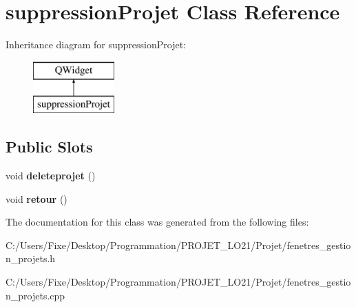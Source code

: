 \hypertarget{classsuppression_projet}{}\section{suppression\+Projet Class Reference}
\label{classsuppression_projet}
Inheritance diagram for suppression\+Projet\+:\begin{figure}[H]
\begin{center}
\leavevmode
\includegraphics[height=2.000000cm]{classsuppression_projet}
\end{center}
\end{figure}
\subsection*{Public Slots}
\begin{DoxyCompactItemize}
\item 
\hypertarget{classsuppression_projet_a2f70877da187f6781c6c21daa42011b2}{}void {\bfseries deleteprojet} ()\label{classsuppression_projet_a2f70877da187f6781c6c21daa42011b2}

\item 
\hypertarget{classsuppression_projet_aeb9657af41b61c4a7bb040fe4d43eb3a}{}void {\bfseries retour} ()\label{classsuppression_projet_aeb9657af41b61c4a7bb040fe4d43eb3a}

\end{DoxyCompactItemize}


The documentation for this class was generated from the following files\+:\begin{DoxyCompactItemize}
\item 
C\+:/\+Users/\+Fixe/\+Desktop/\+Programmation/\+P\+R\+O\+J\+E\+T\+\_\+\+L\+O21/\+Projet/fenetres\+\_\+gestion\+\_\+projets.\+h\item 
C\+:/\+Users/\+Fixe/\+Desktop/\+Programmation/\+P\+R\+O\+J\+E\+T\+\_\+\+L\+O21/\+Projet/fenetres\+\_\+gestion\+\_\+projets.\+cpp\end{DoxyCompactItemize}
